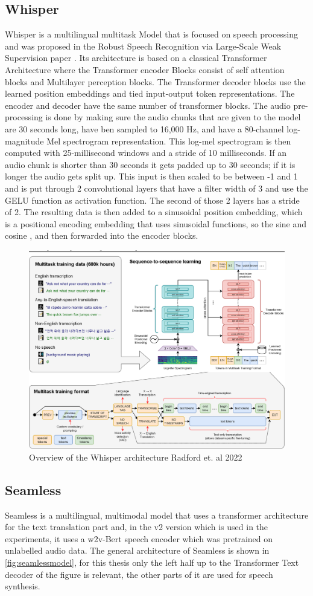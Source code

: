 \subsection{Whisper}
Whisper is a multilingual multitask Model that is focused on speech processing and was proposed in the Robust Speech Recognition via Large-Scale Weak Supervision paper \cite{radford2022robust}. 
Its architecture is based on a classical Transformer Architecture where the Transformer encoder Blocks consist of self attention blocks and Multilayer perception blocks. 
The Transformer decoder blocks use the learned position embeddings and tied input-output token representations. 
The encoder and decoder have the same number of transformer blocks.
The audio pre-processing is done by making sure the audio chunks that are given to the model are 30 seconds long, have ben sampled to 16,000 Hz, and have a 80-channel log-magnitude Mel spectrogram representation. This log-mel spectrogram is then computed with 25-millisecond windows and a stride of 10 milliseconds. If an audio chunk is shorter than 30 seconds it gets padded up to 30 seconds; if it is longer the audio gets split up. 
This input is then scaled to be between -1 and 1 and is put through 2 convolutional layers that have a filter width of 3 and use the GELU function as activation function. The second of those 2 layers has a stride of 2. 
The resulting data is then added to a sinusoidal position embedding, which is a positional encoding embedding that uses sinusoidal functions, so the sine and cosine \cite{vaswani2023attentionneed}, and then forwarded into the encoder blocks.

\begin{figure}
        \centering%
        \includegraphics[width=0.5\linewidth]{Latex//sections//images/whispermodel.png}
        \caption{Overview of the Whisper architecture Radford et. al 2022}
        \label{fig:whispermodel}
    \end{figure}



\subsection{Seamless}
Seamless \cite{seamless2023} is a multilingual, multimodal model that uses a transformer architecture for the text translation part and, in the v2 version which is used in the experiments, it uses a w2v-Bert speech encoder which was pretrained on unlabelled audio data. 
The general architecture of Seamless is shown in \autoref{fig:seamlessmodel}, for this thesis only the left half up to the Transformer Text decoder of the figure is relevant, the other parts of it are used for speech synthesis.


